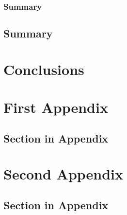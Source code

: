 	\subsection{Summary}
	\lipsum[1] %
  
  \section{Summary}
    \lipsum[6] %



\chapter{Conclusions}
  \lipsum[1] %



\printbibliography[title={References},heading=bibintoc] %



\begin{uomappendix} 
  \chapter{First Appendix}
    \section{Section in Appendix}
    \lipsum[1-6]

  \chapter{Second Appendix}
    \section{Section in Appendix}
    \lipsum[1-6]
\end{uomappendix}



